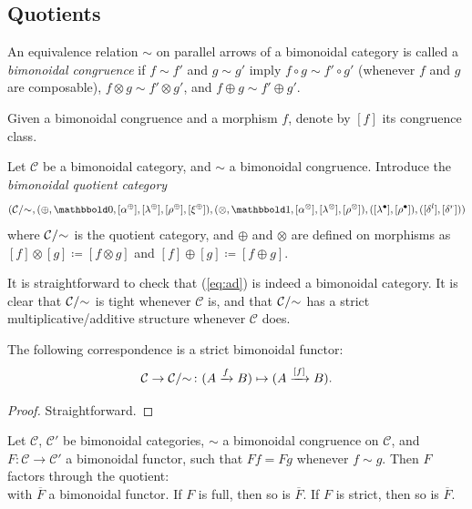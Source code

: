 \documentclass[10pt]{simplearticle}
\newcommand{\tikzinput}[1]{}
\newcommand{\tensorunit}{\mathbbold1}
\newcommand{\bbzero}{\mathbbold0}
\newcommand{\modrel}[1]{/\hspace{-0.6ex}#1\hspace{0.1ex}}
\begin{document}
\subsection{Quotients}
\begin{defn}
An equivalence relation $\sim$ on parallel arrows of a bimonoidal
category is called a \emph{bimonoidal congruence} if $f\sim f'$ and
$g\sim g'$ imply $f\circ g\sim f'\circ g'$ (whenever $f$ and $g$
are composable), $f\otimes g\sim f'\otimes g'$, and $f\oplus g\sim f'\oplus g'$.
\end{defn}

Given a bimonoidal congruence and a morphism $f$, denote by $[f]$
its congruence class.
\begin{defn}\label{def:aj}
Let $\mathcal{C}$ be a bimonoidal category, and $\sim$
a bimonoidal congruence. Introduce the \emph{bimonoidal quotient category}
\begin{equation}
(\mathcal{C}\modrel{\sim},(\oplus,\bbzero,[\alpha^{\oplus}],[\lambda^{\oplus}],[\rho^{\oplus}],[\xi^{\oplus}]),(\otimes,\tensorunit,[\alpha^{\otimes}],[\lambda^{\otimes}],[\rho^{\otimes}]),([\lambda^{\bullet}],[\rho^{\bullet}]),([\delta^{l}],[\delta^{r}]))\label{eq:ad}
\end{equation}
where $\mathcal{C}\modrel{\sim}$ is the quotient category, and $\oplus$
and $\otimes$ are defined on morphisms as $[f]\otimes[g]\coloneqq[f\otimes g]$
and $[f]\oplus[g]\coloneqq[f\oplus g]$.
\end{defn}

\begin{rem}\label{rem:quot-tight-strict}
It is straightforward to check that
(\ref{eq:ad}) is indeed a bimonoidal category. It is clear that $\mathcal{C}\modrel{\sim}$
is tight whenever $\mathcal{C}$ is, and that $\mathcal{C}\modrel{\sim}$
has a strict multiplicative/additive structure whenever $\mathcal{C}$
does.
\end{rem}

\begin{lem}
The following correspondence is a strict bimonoidal functor:
\[
\mathcal{C}\to\mathcal{C}\modrel{\sim}\colon(A\xrightarrow{f}B)\mapsto(A\xrightarrow{[f]}B).
\]
\end{lem}

\begin{proof}
Straightforward.
\end{proof}

\begin{lem}\label{lem:ak}
Let $\mathcal{C}$, $\mathcal{C}'$ be bimonoidal categories,
$\sim$ a bimonoidal congruence on $\mathcal{C}$, and $F\colon\mathcal{C}\to\mathcal{C}'$
a bimonoidal functor, such that $Ff=Fg$ whenever $f\sim g$. Then
$F$ factors through the quotient:
\[
\tikzinput{d418}
\]
with $\overline{F}$ a bimonoidal functor. If $F$ is full, then so
is $\overline{F}$. If $F$ is strict, then so is $\overline{F}$.
\end{lem}
\end{document}
